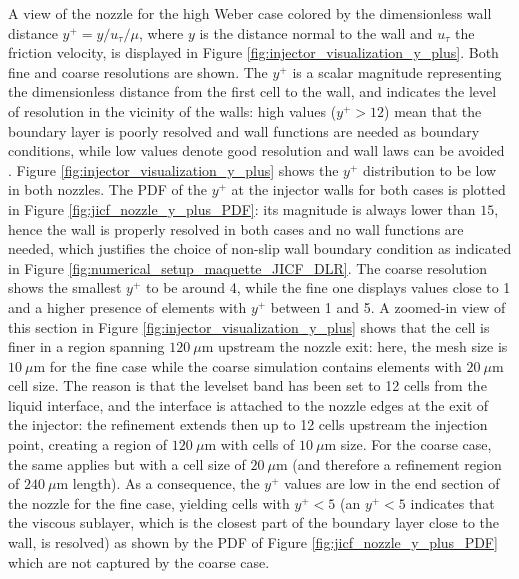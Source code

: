 A view of the nozzle for the high Weber case colored by the dimensionless wall distance $y^+ = y / u_\tau / \mu$, where $y$ is the distance normal to the wall and $u_\tau$ the friction velocity, is displayed in Figure \ref{fig:injector_visualization_y_plus}. Both fine and coarse resolutions are shown. The $y^+$ is a scalar magnitude representing the dimensionless distance from the first cell to the wall, and indicates the level of resolution in the vicinity of the walls: high values ($y^+ > 12$) mean that the boundary layer is poorly resolved and wall functions are needed as boundary conditions, while low values denote good resolution and wall laws can be avoided . Figure \ref{fig:injector_visualization_y_plus} shows the $y^+$ distribution to be low in both nozzles. The PDF of the $y^+$ at the injector walls for both cases is plotted in Figure \ref{fig:jicf_nozzle_y_plus_PDF}: its magnitude is always lower than $15$, hence the wall is properly resolved in both cases and no wall functions are needed, which justifies the choice of non-slip wall boundary condition as indicated in Figure \ref{fig:numerical_setup_maquette_JICF_DLR}.  The coarse resolution shows the smallest $y^+$ to be around 4, while the fine one displays values close to 1 and a higher presence of elements with $y^+$ between 1 and 5. A zoomed-in view of this section in Figure \ref{fig:injector_visualization_y_plus} shows that the cell is finer in a region spanning $120~ \mu$m upstream the nozzle exit: here, the mesh size is $10~ \mu$m for the fine case while the coarse simulation contains elements with $20 ~\mu$m cell size. The reason is that the levelset band has been set to 12 cells from the liquid interface, and the interface is attached to the nozzle edges at the exit of the injector: the refinement extends then up to 12 cells upstream the injection point, creating a region of $120~\mu$m with cells of $10~\mu$m size. For the coarse case, the same applies but with a cell size of $20~\mu$m (and therefore a refinement region of $240~\mu$m length). As a consequence, the $y^+$ values are low in the end section of the nozzle for the fine case, yielding cells with $y^+ < 5$ (an $y^+ < 5$ indicates that the viscous sublayer, which is the closest part of the boundary layer close to the wall, is resolved) as shown by the PDF of Figure \ref{fig:jicf_nozzle_y_plus_PDF} which are not captured by the coarse case. 



